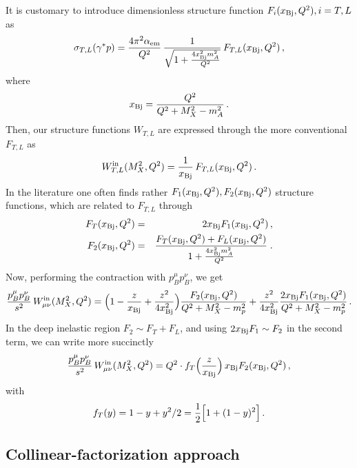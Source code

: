 It is customary to introduce dimensionless structure function $F_i(x_{\rm Bj},Q^2), i = T,L$ as
\begin{eqnarray}
 \sigma_{T,L}(\gamma^* p) = {4 \pi^2 {\alpha_{\mathrm{em}}} \over Q^2} \, {1 \over \sqrt{1 + {4 x^2_{\rm Bj} m_A^2 \over Q^2}} } \, F_{T,L}(x_{\rm Bj},Q^2) \, ,
\end{eqnarray}
where
\begin{eqnarray}
 x_{\rm Bj} = { Q^2 \over Q^2 + M_X^2 - m_A^2} \, .
\end{eqnarray}
Then, our structure functions $W_{T,L}$ are expressed through the more conventional $F_{T,L}$ as
\begin{eqnarray}
 W^{\rm{in}}_{T,L}(M_X^2,Q^2) = {1 \over x_{\rm Bj}} \, F_{T,L}(x_{\rm Bj},Q^2) \, . 
\end{eqnarray}
In the literature one often finds rather $F_1(x_{\rm Bj}, Q^2), F_2(x_{\rm Bj},Q^2)$
structure functions, which are related to $F_{T,L}$ through
\begin{eqnarray}
 F_T(x_{\rm Bj},Q^2) &=& 2x_{\rm Bj}  F_1(x_{\rm Bj},Q^2) \, , \nonumber \\
F_2(x_{\rm Bj},Q^2)  &=& { F_T(x_{\rm Bj},Q^2) +F_L(x_{\rm Bj},Q^2)
  \over 1 + {4 x^2_{\rm Bj} m_A^2 \over Q^2}} \; .
\end{eqnarray}
Now, performing the contraction with $p^\mu_B p^\nu_B$, we get
\begin{eqnarray}
  {p_B^\mu p_B^\nu \over s^2} \, W^{\rm in}_{\mu \nu}(M_X^2,Q^2) = \Big( 1 - {z \over x_{\rm Bj}} + {z^2\over 4 x_{\rm Bj}^2} \Big) {F_2(x_{\rm Bj},Q^2) \over Q^2 + M_X^2 - m_p^2} 
+ {z^2 \over 4 x^2_{\rm Bj}} { 2 x_{\rm Bj} F_1(x_{\rm Bj},Q^2) \over Q^2 + M_X^2 - m_p^2} \, .
\end{eqnarray}
In the deep inelastic region $F_2 \sim F_T + F_L$, and using $2x_{\rm Bj} F_1 \sim F_2$ in the second term, we can write more succinctly
\begin{eqnarray}
  {p_B^\mu p_B^\nu \over s^2} \, W^{\rm in}_{\mu \nu}(M_X^2,Q^2) = Q^2 \cdot f_T \Big( {z \over x_{\rm Bj}} \Big) \,  x_{\rm Bj} F_2(x_{\rm Bj},Q^2) \, ,
\end{eqnarray}
with 
\begin{eqnarray}
 f_T(y) = 1 - y + y^2/2 = {1 \over 2} \Big[ 1 + (1-y)^2 \Big] \, .
\end{eqnarray}

\subsection{Collinear-factorization approach}

